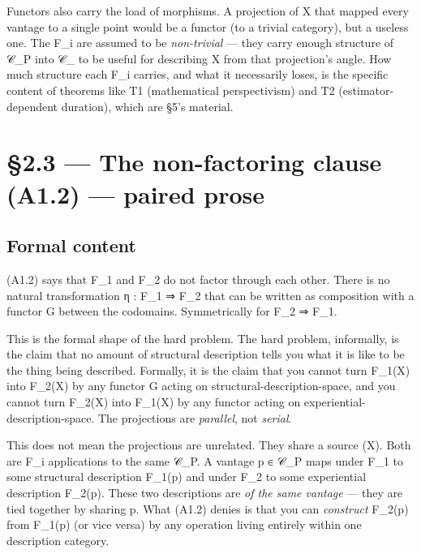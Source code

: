 \documentclass[11pt, openany]{book}
\newcommand{\sectionbreak}{\clearpage}
\begin{document}
Functors also carry the load of morphisms. A projection of X that mapped every vantage to a single point would be a functor (to a trivial category), but a useless one. The F\_\allowbreak{}i are assumed to be \textit{non-trivial} --- they carry enough structure of 𝒞\_\allowbreak{}P into 𝒞\_ to be useful for describing X from that projection's angle. How much structure each F\_\allowbreak{}i carries, and what it necessarily loses, is the specific content of theorems like T1 (mathematical perspectivism) and T2 (estimator-dependent duration), which are §5's material.

\sectionbreak

\section{§2.3 --- The non-factoring clause (A1.2) --- paired prose}

\subsection{Formal content}

(A1.2) says that F\_\allowbreak{}1 and F\_\allowbreak{}2 do not factor through each other. There is no natural transformation η : F\_\allowbreak{}1 ⇒ F\_\allowbreak{}2 that can be written as composition with a functor G between the codomains. Symmetrically for F\_\allowbreak{}2 ⇒ F\_\allowbreak{}1.

This is the formal shape of the hard problem. The hard problem, informally, is the claim that no amount of structural description tells you what it is like to be the thing being described. Formally, it is the claim that you cannot turn F\_\allowbreak{}1(X) into F\_\allowbreak{}2(X) by any functor G acting on structural-description-space, and you cannot turn F\_\allowbreak{}2(X) into F\_\allowbreak{}1(X) by any functor acting on experiential-description-space. The projections are \textit{parallel}, not \textit{serial}.

This does not mean the projections are unrelated. They share a source (X). Both are F\_\allowbreak{}i applications to the same 𝒞\_\allowbreak{}P. A vantage p ∈ 𝒞\_\allowbreak{}P maps under F\_\allowbreak{}1 to some structural description F\_\allowbreak{}1(p) and under F\_\allowbreak{}2 to some experiential description F\_\allowbreak{}2(p). These two descriptions are \textit{of the same vantage} --- they are tied together by sharing p. What (A1.2) denies is that you can \textit{construct} F\_\allowbreak{}2(p) from F\_\allowbreak{}1(p) (or vice versa) by any operation living entirely within one description category.
\end{document}
